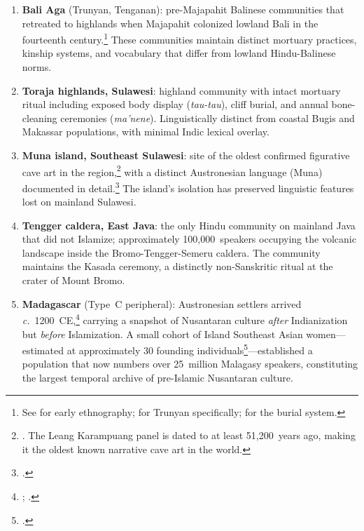 \documentclass[12pt,a4paper]{article}
\begin{document}
\begin{enumerate}
\item \textbf{Bali Aga} (Trunyan, Tenganan): pre-Majapahit Balinese communities that retreated to highlands when Majapahit colonized lowland Bali in the fourteenth century.\footnote{See \autocite{covarrubias1937bali} for early ethnography; \autocite{danandjaja1980kebudayaan} for Trunyan specifically; \autocite{astiti2005trunyan} for the burial system.} These communities maintain distinct mortuary practices, kinship systems, and vocabulary that differ from lowland Hindu-Balinese norms.

\item \textbf{Toraja highlands, Sulawesi}: highland community with intact mortuary ritual including exposed body display (\emph{tau-tau}), cliff burial, and annual bone-cleaning ceremonies (\emph{ma'nene}). Linguistically distinct from coastal Bugis and Makassar populations, with minimal Indic lexical overlay.

\item \textbf{Muna island, Southeast Sulawesi}: site of the oldest confirmed figurative cave art in the region,\footnote{\autocite{oktaviana2024cave}. The Leang Karampuang panel is dated to at least 51,200~years ago, making it the oldest known narrative cave art in the world.} with a distinct Austronesian language (Muna) documented in detail.\footnote{\autocite{vandenberg1996muna}.} The island's isolation has preserved linguistic features lost on mainland Sulawesi.

\item \textbf{Tengger caldera, East Java}: the only Hindu community on mainland Java that did not Islamize; approximately 100,000~speakers occupying the volcanic landscape inside the Bromo-Tengger-Semeru caldera. The community maintains the Kasada ceremony, a distinctly non-Sanskritic ritual at the crater of Mount Bromo.

\item \textbf{Madagascar} (Type~C peripheral): Austronesian settlers arrived \textit{c.}~1200~CE,\footnote{\autocite{cox2012small}; \autocite{beaujard2011first}.} carrying a snapshot of Nusantaran culture \emph{after} Indianization but \emph{before} Islamization. A small cohort of Island Southeast Asian women---estimated at approximately 30 founding individuals\footnote{\autocite{cox2012small}.}---established a population that now numbers over 25~million Malagasy speakers, constituting the largest temporal archive of pre-Islamic Nusantaran culture.
\end{enumerate}
\end{document}

